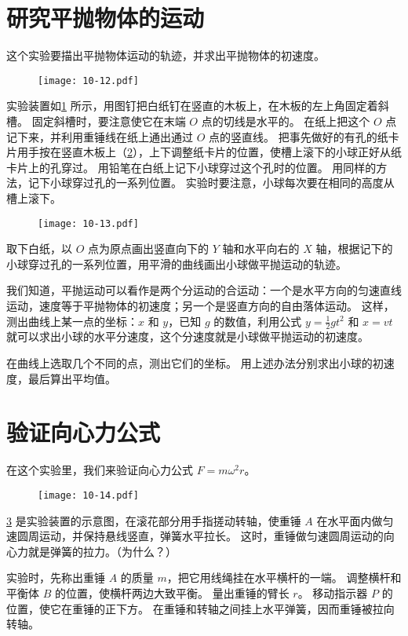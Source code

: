 \section{研究平抛物体的运动}

这个实验要描出平抛物体运动的轨迹，并求出平抛物体的初速度。
\begin{figure}
  \texttt{[image: 10-12.pdf]}
  \caption{}\label{fig:10-12}
\end{figure}

实验装置如\cref{fig:10-12} 所示，用图钉把白纸钉在竖直的木板上，在木板的左上角固定着斜槽。
固定斜槽时，要注意使它在末端 $O$ 点的切线是水平的。
在纸上把这个 $O$ 点记下来，并利用重锤线在纸上通出通过 $O$ 点的竖直线。
把事先做好的有孔的纸卡片用手按在竖直木板上（\cref{fig:10-13}），上下调整纸卡片的位置，使槽上滚下的小球正好从纸卡片上的孔穿过。
用铅笔在白纸上记下小球穿过这个孔时的位置。
用同样的方法，记下小球穿过孔的一系列位置。
实验时要注意，小球每次要在相同的高度从槽上滚下。
\begin{figure}
  \texttt{[image: 10-13.pdf]}
    \caption{}\label{fig:10-13}
\end{figure}

取下白纸，以 $O$ 点为原点画出竖直向下的 $Y$ 轴和水平向右的 $X$ 轴，根据记下的小球穿过孔的一系列位置，用平滑的曲线画出小球做平抛运动的轨迹。

我们知道，平抛运动可以看作是两个分运动的合运动：一个是水平方向的匀速直线运动，速度等于平抛物体的初速度；另一个是竖直方向的自由落体运动。
这样，测出曲线上某一点的坐标：$x$ 和 $y$，已知 $g$ 的数值，利用公式 $y=\frac{1}{2}gt^2$ 和 $x=vt$ 就可以求出小球的水平分速度，这个分速度就是小球做平抛运动的初速度。

在曲线上选取几个不同的点，测出它们的坐标。
用上述办法分别求出小球的初速度，最后算出平均值。

\section{验证向心力公式}
在这个实验里，我们来验证向心力公式 $F=m\omega^2r$。
\begin{figure}
  \texttt{[image: 10-14.pdf]}
  \caption{}\label{fig:10-14}
\end{figure}

\cref{fig:10-14} 是实验装置的示意图，在滚花部分用手指搓动转轴，使重锤 $A$ 在水平面内做匀速圆周运动，并保持悬线竖直，弹簧水平拉长。
这时，重锤做匀速圆周运动的向心力就是弹簧的拉力。（为什么？）

实验时，先称出重锤 $A$ 的质量 $m$，把它用线绳挂在水平横杆的一端。
调整横杆和平衡体 $B$ 的位置，使横杆两边大致平衡。
量出重锤的臂长 $r$。
移动指示器 $P$ 的位置，使它在重锤的正下方。
在重锤和转轴之间挂上水平弹簧，因而重锤被拉向转轴。

